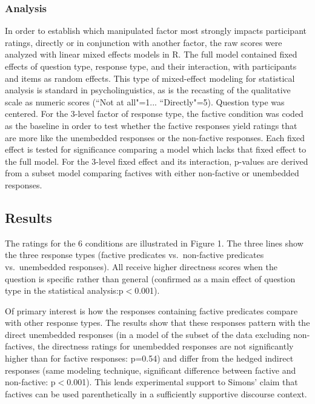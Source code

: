 \documentclass[output=paper]{LSP/langsci}
\begin{document}
\subsubsection*{Analysis}

In order to establish which manipulated factor most strongly impacts
participant ratings, directly or in conjunction with another factor, the raw
scores were analyzed with linear mixed effects models in R. The full model
contained fixed effects of question type, response type, and their interaction,
with participants and items as random effects. This type of mixed-effect
modeling for statistical analysis is standard in psycholinguistics, as is the
recasting of the qualitative scale as numeric scores (``Not at all"=1...
``Directly"=5). Question type was centered. For the 3-level factor of response
type, the factive condition was coded as the baseline in order to test whether
the factive responses yield ratings that are more like the unembedded responses
or the non-factive responses.  Each fixed effect is tested for significance
comparing a model which lacks that fixed effect to the full model.  For the
3-level fixed effect and its interaction, p-values are derived from a subset
model comparing factives with either non-factive or unembedded responses.

\subsection{Results}
\label{sec:exp1}

The ratings for the 6 conditions are illustrated in Figure 1.  The three lines show the three response types (factive predicates vs.\ non-factive predicates vs.\ unembedded responses).  All receive higher directness scores when the question is specific rather than general (confirmed as a main effect of question type in the statistical analysis:p$<$0.001).

Of primary interest is how the responses containing factive predicates compare with other response types. The results show that these responses pattern with the direct unembedded responses (in a model of the subset of the data excluding non-factives, the directness ratings for unembedded responses are not significantly higher than for factive responses: p=0.54) and differ from the hedged indirect responses (same modeling technique, significant difference between factive and non-factive: p$<$0.001).  This lends experimental support to Simons' claim that factives can be used parenthetically in a sufficiently supportive discourse context.
\end{document}
